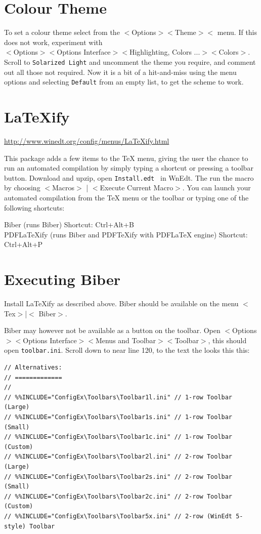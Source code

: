 \section{Colour Theme}

To set a colour theme select from the
$<$Options$>$$<$Theme$>$$<$ menu.  If this does not work, experiment with \\
$<$Options$>$$<$Options Interface$>$$<$Highlighting, Colors ...$>$$<$Colors$>$. Scroll to \lstinline{Solarized Light} and uncomment the theme you require, and comment out all those not required.  Now it is a bit of a hit-and-miss using the menu options and selecting \lstinline{Default} from an empty list, to get the scheme to work.


\section{LaTeXify}

\url{http://www.winedt.org/config/menus/LaTeXify.html}

This package adds a few items to the TeX menu, giving the user the chance to run an automated compilation by simply typing a shortcut or pressing a toolbar button.  Download and upzip, open \lstinline{Install.edt } in WnEdt. The run the macro  by choosing $<$Macros$>$ | $<$Execute Current Macro$>$.  You can launch your automated compilation from the TeX menu or the toolbar or typing one of the following shortcuts:

Biber (runs Biber) Shortcut: Ctrl+Alt+B\\
PDFLaTeXify (runs Biber and PDFTeXify with PDFLaTeX engine) Shortcut: Ctrl+Alt+P

\section{Executing Biber}

Install LaTeXify as described above. Biber should be available on the menu $<$ Tex$>$|$<$ Biber$>$.

Biber may however not be available as a button on the toolbar. Open
$<$Options$>$$<$Options Interface$>$$<$Menus and Toolbar$>$$<$Toolbar$>$, this should open \lstinline{toolbar.ini}.
Scroll down to near line 120, to the text the looks this this:

\begin{lstlisting}
// Alternatives:
// =============
//
// %%INCLUDE="ConfigEx\Toolbars\Toolbar1l.ini" // 1-row Toolbar (Large)
// %%INCLUDE="ConfigEx\Toolbars\Toolbar1s.ini" // 1-row Toolbar (Small)
// %%INCLUDE="ConfigEx\Toolbars\Toolbar1c.ini" // 1-row Toolbar (Custom)
// %%INCLUDE="ConfigEx\Toolbars\Toolbar2l.ini" // 2-row Toolbar (Large)
// %%INCLUDE="ConfigEx\Toolbars\Toolbar2s.ini" // 2-row Toolbar (Small)
// %%INCLUDE="ConfigEx\Toolbars\Toolbar2c.ini" // 2-row Toolbar (Custom)
// %%INCLUDE="ConfigEx\Toolbars\Toolbar5x.ini" // 2-row (WinEdt 5-style) Toolbar
\end{lstlisting}

